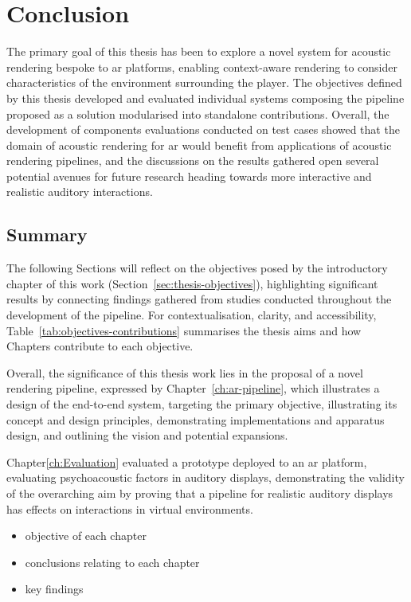 \chapter{Conclusion}\label{ch:Conclusion}

The primary goal of this thesis has been to explore a novel system for acoustic rendering bespoke to \acrshort{ar} platforms, enabling context-aware rendering to consider characteristics of the environment surrounding the player. The objectives defined by this thesis developed and evaluated individual systems composing the pipeline proposed as a solution modularised into standalone contributions. Overall, the development of components evaluations conducted on test cases showed that the domain of acoustic rendering for \acrshort{ar} would benefit from applications of acoustic rendering pipelines, and the discussions on the results gathered open several potential avenues for future research heading towards more interactive and realistic auditory interactions.

\section{Summary}
The following Sections will reflect on the objectives posed by the introductory chapter of this work (Section~\ref{sec:thesis-objectives}), highlighting significant results by connecting findings gathered from studies conducted throughout the development of the pipeline. For contextualisation, clarity, and accessibility, Table~\ref{tab:objectives-contributions} summarises the thesis aims and how Chapters contribute to each objective.


Overall, the significance of this thesis work lies in the proposal of a novel rendering pipeline, expressed by Chapter~\ref{ch:ar-pipeline}, which illustrates a design of the end-to-end system, targeting the primary objective, illustrating its concept and design principles, demonstrating implementations and apparatus design, and outlining the vision and potential expansions.\par
Chapter\ref{ch:Evaluation} evaluated a prototype deployed to an \acrshort{ar} platform, evaluating psychoacoustic factors in auditory displays, demonstrating the validity of the overarching aim by proving that a pipeline for realistic auditory displays has effects on interactions in virtual environments. 

\begin{itemize}
    \item objective of each chapter
    \item conclusions relating to each chapter
    \item key findings
\end{itemize}

